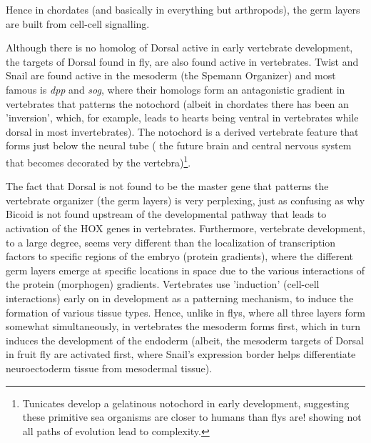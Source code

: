 Hence in chordates (and basically in everything but arthropods), the germ layers are built from cell-cell signalling.    

Although there is no homolog of Dorsal active in early vertebrate development, the targets of Dorsal found in fly, are also found active in vertebrates.  Twist and Snail are found active in the mesoderm (the Spemann Organizer) and most famous is \textit{dpp} and \textit{sog}, where their homologs form an antagonistic gradient in vertebrates that patterns the notochord (albeit in chordates there has been an 'inversion', which, for example, leads to hearts being ventral in vertebrates while dorsal in most invertebrates).  The notochord is a derived vertebrate feature that forms just below the neural tube ( the future brain and central nervous system that becomes decorated by the vertebra)\footnote{Tunicates develop a gelatinous notochord in early development, suggesting these primitive sea organisms are closer to humans than flys are! showing not all paths of evolution lead to complexity.}. 

The fact that Dorsal is not found to be the master gene that patterns the vertebrate organizer (the germ layers) is very perplexing, just as confusing as why Bicoid is not found upstream of the developmental pathway that leads to activation of the HOX genes in vertebrates.  Furthermore, vertebrate development, to a large degree, seems very different than the localization of transcription factors to specific regions of the embryo (protein gradients), where the different germ layers emerge at specific locations in space due to the various interactions of the protein (morphogen) gradients. Vertebrates use 'induction' (cell-cell interactions) early on in development as a patterning mechanism, to induce the formation of various tissue types.  Hence, unlike in flys, where all three layers form somewhat simultaneously, in vertebrates the mesoderm forms first, which in turn induces the development of the endoderm (albeit, the mesoderm targets of Dorsal in fruit fly are activated first, where Snail's expression border helps differentiate neuroectoderm tissue from mesodermal tissue). 
  
